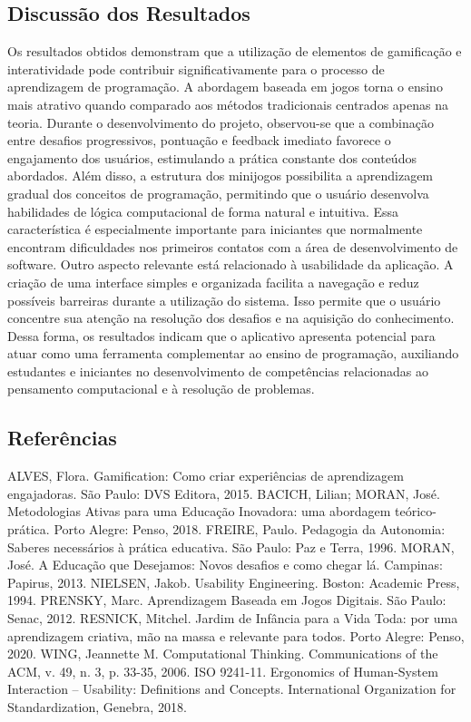 \documentclass{article}
\begin{document}
\subsection{Discussão dos Resultados}
Os resultados obtidos demonstram que a utilização de elementos de gamificação e interatividade pode contribuir significativamente para o processo de aprendizagem de programação. A abordagem baseada em jogos torna o ensino mais atrativo quando comparado aos métodos tradicionais centrados apenas na teoria.
Durante o desenvolvimento do projeto, observou-se que a combinação entre desafios progressivos, pontuação e feedback imediato favorece o engajamento dos usuários, estimulando a prática constante dos conteúdos abordados.
Além disso, a estrutura dos minijogos possibilita a aprendizagem gradual dos conceitos de programação, permitindo que o usuário desenvolva habilidades de lógica computacional de forma natural e intuitiva. Essa característica é especialmente importante para iniciantes que normalmente encontram dificuldades nos primeiros contatos com a área de desenvolvimento de software.
Outro aspecto relevante está relacionado à usabilidade da aplicação. A criação de uma interface simples e organizada facilita a navegação e reduz possíveis barreiras durante a utilização do sistema. Isso permite que o usuário concentre sua atenção na resolução dos desafios e na aquisição do conhecimento.
Dessa forma, os resultados indicam que o aplicativo apresenta potencial para atuar como uma ferramenta complementar ao ensino de programação, auxiliando estudantes e iniciantes no desenvolvimento de competências relacionadas ao pensamento computacional e à resolução de problemas.

\subsection{ Referências}
ALVES, Flora. Gamification: Como criar experiências de aprendizagem engajadoras. São Paulo: DVS Editora, 2015.
BACICH, Lilian; MORAN, José. Metodologias Ativas para uma Educação Inovadora: uma abordagem teórico-prática. Porto Alegre: Penso, 2018.
FREIRE, Paulo. Pedagogia da Autonomia: Saberes necessários à prática educativa. São Paulo: Paz e Terra, 1996.
MORAN, José. A Educação que Desejamos: Novos desafios e como chegar lá. Campinas: Papirus, 2013.
NIELSEN, Jakob. Usability Engineering. Boston: Academic Press, 1994.
PRENSKY, Marc. Aprendizagem Baseada em Jogos Digitais. São Paulo: Senac, 2012.
RESNICK, Mitchel. Jardim de Infância para a Vida Toda: por uma aprendizagem criativa, mão na massa e relevante para todos. Porto Alegre: Penso, 2020.
WING, Jeannette M. Computational Thinking. Communications of the ACM, v. 49, n. 3, p. 33-35, 2006.
ISO 9241-11. Ergonomics of Human-System Interaction – Usability: Definitions and Concepts. International Organization for Standardization, Genebra, 2018.
\end{document}
